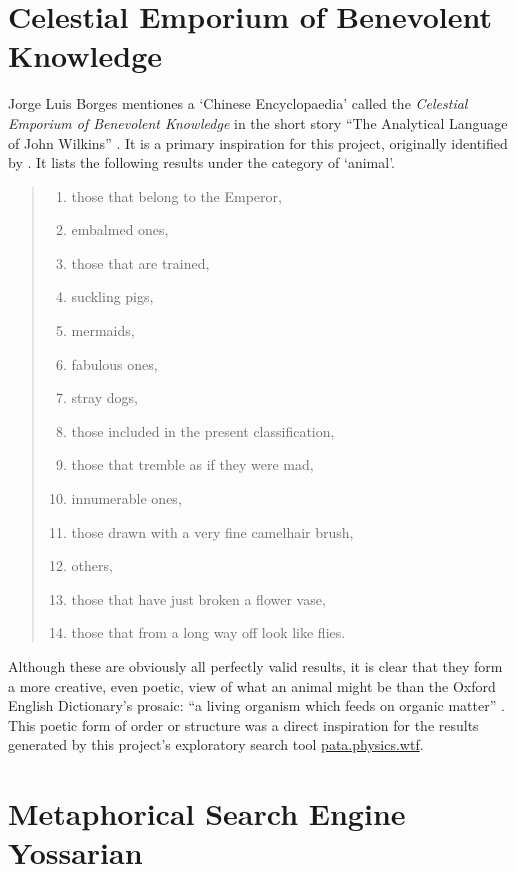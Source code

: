 \section{Celestial Emporium of Benevolent Knowledge}

Jorge Luis Borges mentiones a `Chinese Encyclopaedia' called the \textit{Celestial Emporium of Benevolent Knowledge} in the short story ``The Analytical Language of John Wilkins'' \autocite{Borges2000}. It is a primary inspiration for this project, originally identified by \autocite{Hendler2011, Hendler2013}. It lists the following results under the category of `animal'.

\begin{quotation}
\begin{enumerate}
  \item those that belong to the Emperor,
  \item embalmed ones,
  \item those that are trained,
  \item suckling pigs,
  \item mermaids,
  \item fabulous ones,
  \item stray dogs,
  \item those included in the present classification,
  \item those that tremble as if they were mad,
  \item innumerable ones,
  \item those drawn with a very fine camelhair brush,
  \item others,
  \item those that have just broken a flower vase,
  \item those that from a long way off look like flies.
\end{enumerate}
\end{quotation}

Although these are obviously all perfectly valid results, it is clear that they form a more creative, even poetic, view of what an animal might be than the Oxford English Dictionary's prosaic: ``a living organism which feeds on organic matter'' \autocite{OEDanimal}. This poetic form of order or structure was a direct inspiration for the results generated by this project's exploratory search tool \url{pata.physics.wtf}.


\section{Metaphorical Search Engine Yossarian}

